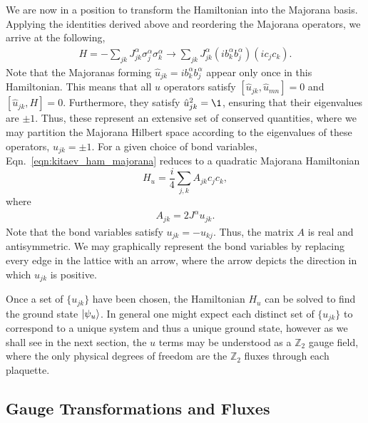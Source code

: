 We are now in a position to transform the Hamiltonian into the Majorana basis. Applying the identities derived above and reordering the Majorana operators, we arrive at the following,
\begin{align} \label{eqn:kitaev_ham_majorana}
    H = -\sum_{jk} J^\alpha_{jk} 
    \sigma_j^\alpha \sigma_k^\alpha \rightarrow 
    \sum_{jk} J^\alpha_{jk}
    (i b^\alpha_k b^\alpha_j) (i c_j c_k ).
\end{align}
Note that the Majoranas forming $\hat u_{jk} = i b^\alpha_k b^\alpha_j$ appear only once in this Hamiltonian. This means that all $\hat u$ operators satisfy $[\hat u_{jk},\hat u_{mn}] = 0$ and $[\hat u_{jk},H] = 0$. Furthermore, they satisfy $\hat u_{jk}^2 = \1$, ensuring that their eigenvalues are $\pm 1$. Thus, these represent an extensive set of conserved quantities, where we may partition the Majorana Hilbert space according to the eigenvalues of these operators, $u_{jk}=\pm 1$. For a given choice of bond variables, Eqn.~\ref{eqn:kitaev_ham_majorana} reduces to a quadratic Majorana Hamiltonian
\begin{equation}\label{eqn:majorana_hamiltonian_with_u}
    H_u = \frac{i}{4}\sum_{ j,k }A_{jk} c_j c_k,
\end{equation}
where 
\begin{align}\label{eqn:iA_definition}
    A_{jk}=2J^{\alpha}u_{jk}.
\end{align} 
Note that the bond variables satisfy $u_{jk} = -u_{kj}$. Thus, the matrix $A$ is real and antisymmetric. We may graphically represent the bond variables by replacing every edge in the lattice with an arrow, where the arrow depicts the direction in which $u_{jk}$ is positive. 

Once a set of $\{u_{jk}\}$ have been chosen, the Hamiltonian $H_u$ can be solved to find the ground state $\ket{\psi_u}$. In general one might expect each distinct set of $\{u_{jk}\}$ to correspond to a unique system and thus a unique ground state, however as we shall see in the next section, the $u$ terms may be understood as a $\mathbb Z_2$ gauge field, where the only physical degrees of freedom are the $\mathbb Z_2$ fluxes through each plaquette. 

\subsection{Gauge Transformations and Fluxes}

